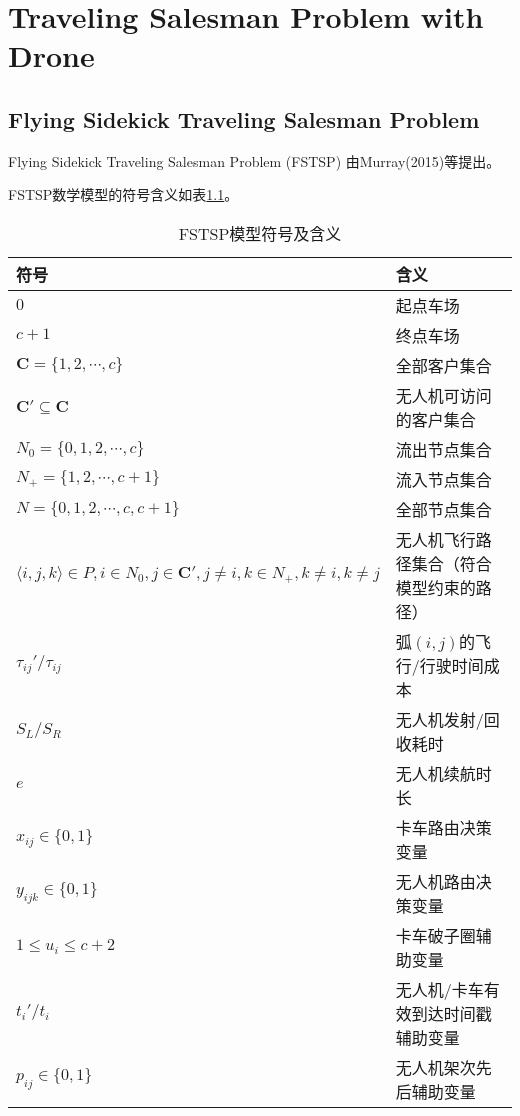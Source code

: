 \chapter{Traveling Salesman Problem with Drone}

\section{Flying Sidekick Traveling Salesman Problem}
Flying Sidekick Traveling Salesman Problem (FSTSP) 由Murray(2015)等\cite{murrayFlyingSidekickTraveling2015}提出。

FSTSP数学模型的符号含义如表\ref{tab:fstsp-sign-meaning}。

\begin{table}[!htbp]
    \centering
    \caption{FSTSP模型符号及含义}
    \label{tab:fstsp-sign-meaning}
    \begin{tabularx}{\textwidth}{lX}
        \toprule[1pt] %
        符号 & 含义 \\
        \midrule[0.75pt] %
        $0$ & 起点车场 \\
        $c + 1$ & 终点车场 \\
        $\mathbf{C}=\{1,2,\cdots,c\}$ & 全部客户集合 \\
        $\mathbf{C}' \subseteq \mathbf{C}$ & 无人机可访问的客户集合 \\
        $N_0 = \{0,1,2,\cdots,c\}$ & 流出节点集合 \\
        $N_+ = \{1,2,\cdots,c + 1\}$ & 流入节点集合 \\
        $N = \{0,1,2,\cdots,c,c + 1\}$ & 全部节点集合 \\
        $\langle i,j,k\rangle \in P, i \in N_0, j \in \mathbf{C}', j \neq i, k \in N_+, k \neq i, k \neq j$ & 无人机飞行路径集合（符合模型约束的路径） \\
        $\tau_{ij}'/\tau_{ij}$ & 弧$(i,j)$的飞行/行驶时间成本 \\
        $S_L/S_R$ & 无人机发射/回收耗时 \\
        $e$ & 无人机续航时长 \\
        $x_{ij} \in \{0,1\}$ & 卡车路由决策变量 \\
        $y_{ijk} \in \{0,1\}$ & 无人机路由决策变量 \\
        $1 \leq u_i \leq c + 2$ & 卡车破子圈辅助变量 \\
        $t_i'/t_i$ & 无人机/卡车有效到达时间戳辅助变量 \\
        $p_{ij} \in \{0,1\}$ & 无人机架次先后辅助变量 \\
        \bottomrule[1pt] %
    \end{tabularx}
\end{table}

